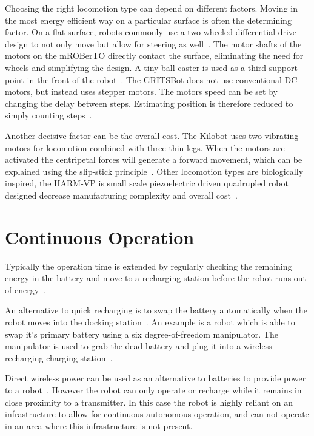 Choosing the right locomotion type can depend on different factors.
Moving in the most energy efficient way on a particular surface is often the determining factor.
On a flat surface, robots commonly use a two-wheeled differential drive design to not only move but allow for steering as well~\cite{sabelhaus_icra_2013, pickem_icra_2015}.
The motor shafts of the motors on the mROBerTO directly contact the surface, eliminating the need for wheels and simplifying the design.
A tiny ball caster is used as a third support point in the front of the robot~\cite{kim_iros_2016}.
The GRITSBot does not use conventional DC motors, but instead uses stepper motors.
The motors speed can be set by changing the delay between steps. 
Estimating position is therefore reduced to simply counting steps~\cite{pickem_icra_2015}.

Another decisive factor can be the overall cost.
The Kilobot uses two vibrating motors for locomotion combined with three thin legs.
When the motors are activated the centripetal forces will generate a forward movement, which can be explained using the slip-stick principle~\cite{rubenstein_icra_2012}.
Other locomotion types are biologically inspired, the HARM-VP is small scale piezoelectric driven quadrupled robot designed decrease manufacturing complexity and overall cost~\cite{baisch_iros_2013}.

\section{Continuous Operation}
\label{sec:rw_continous_operation}

Typically the operation time is extended by regularly checking the remaining energy in the battery and move to a recharging station before the robot runs out of energy~\cite{pickem_icra_2015, rubenstein_icra_2012}.

An alternative to quick recharging is to swap the battery automatically when the robot moves into the docking station~\cite{kemal_mech_2015}.
An example is a robot which is able to swap it's primary battery using a six degree-of-freedom manipulator.
The manipulator is used to grab the dead battery and plug it into a wireless recharging charging station~\cite{zhang_conel_2013}.

Direct wireless power can be used as an alternative to batteries to provide power to a robot~\cite{karpelson_icra_2014}.
However the robot can only operate or recharge while it remains in close proximity to a transmitter. 
In this case the robot is highly reliant on an infrastructure to allow for continuous autonomous operation, and can not operate in an area where this infrastructure is not present.
 
